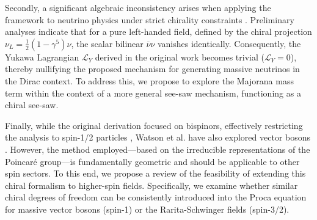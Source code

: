 Secondly, a significant algebraic inconsistency arises when applying the
framework to neutrino physics under strict chirality constraints \cite{watsonChiralSymmetryDirac2020}.
Preliminary analyses indicate that for a pure left-handed field, defined by the chiral
projection $\nu_L = \frac{1}{2}\left(1-\gamma^5\right)\nu$, the scalar bilinear
$\overline{\nu}\nu$ vanishes identically. Consequently, the Yukawa Lagrangian
$\mathcal{L}_Y$ derived in the original work becomes trivial
($\mathcal{L}_Y = 0$), thereby nullifying the proposed mechanism for generating
massive neutrinos in the Dirac context. To address this, we propose to explore
the Majorana mass term within the context of a more general see-saw mechanism,
functioning as a chiral see-saw.

Finally, while the original derivation focused on bispinors, effectively
restricting the analysis to spin-1/2 particles
\cite{watsonChiralSymmetryDirac2020}, Watson et al. have also explored
vector bosons \cite{Watson2022}. However, the method employed---based on the irreducible
representations of the Poincar\'{e} group---is fundamentally geometric and
should be applicable to other spin sectors. To this end, we propose a
review of the feasibility of extending this chiral formalism to
higher-spin fields. Specifically, we examine whether similar chiral degrees of
freedom can be consistently introduced into the Proca equation for massive
vector bosons (spin-1) or the Rarita-Schwinger fields (spin-3/2).
